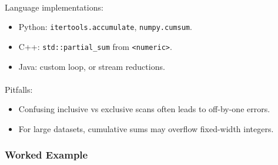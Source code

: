 \documentclass[
  letterpaper,
  DIV=11,
  numbers=noendperiod]{scrreprt}
\makeatletter
\let\oldparagraph\paragraph
\renewcommand{\paragraph}{
    \@ifstar
      \xxxParagraphStar
      \xxxParagraphNoStar
  }
\newcommand{\xxxParagraphStar}[1]{\oldparagraph*{#1}\mbox{}}
\newcommand{\xxxParagraphNoStar}[1]{\oldparagraph{#1}\mbox{}}
\providecommand{\tightlist}{%
  \setlength{\itemsep}{0pt}\setlength{\parskip}{0pt}}
\makeatother
\begin{document}
\paragraph{Language implementations:}\label{language-implementations}

\begin{itemize}
\tightlist
\item
  Python: \texttt{itertools.accumulate}, \texttt{numpy.cumsum}.
\item
  C++: \texttt{std::partial\_sum} from
  \texttt{\textless{}numeric\textgreater{}}.
\item
  Java: custom loop, or stream reductions.
\end{itemize}

\paragraph{Pitfalls:}\label{pitfalls}

\begin{itemize}
\tightlist
\item
  Confusing inclusive vs exclusive scans often leads to off-by-one
  errors.
\item
  For large datasets, cumulative sums may overflow fixed-width integers.
\end{itemize}

\subsubsection{Worked Example}\label{worked-example-11}
\end{document}
